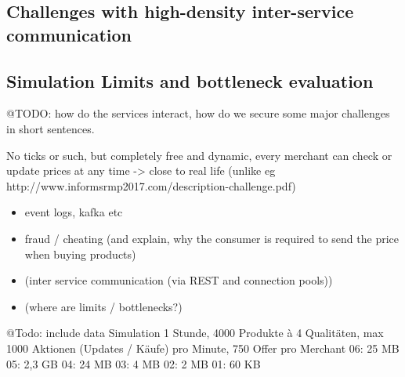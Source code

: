 %
\subsection{Challenges with high-density inter-service communication}
%

%
\subsection{Simulation Limits and bottleneck evaluation}
%

@TODO: how do the services interact, how do we secure some major challenges in short sentences.

No ticks or such, but completely free and dynamic, every merchant can check or update prices at any time -> close to real life (unlike eg http://www.informsrmp2017.com/description-challenge.pdf)

\begin{itemize}
\item event logs, kafka etc
\item fraud / cheating (and explain, why the consumer is required to send the price when buying products)
\item (inter service communication (via REST and connection pools))
\item (where are limits / bottlenecks?)
\end{itemize} 

@Todo: include data
Simulation 1 Stunde, 4000 Produkte à 4 Qualitäten, max 1000 Aktionen (Updates / Käufe) pro Minute, 750 Offer pro Merchant
06: 25 MB
05: 2,3 GB
04: 24 MB
03: 4 MB
02: 2 MB
01: 60 KB